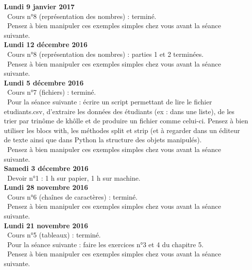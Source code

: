 \documentclass[12pt,a4paper]{article}
\begin{document}
\noindent\textbf{Lundi 9 janvier 2017}\\
\bu\ Cours n°8 (représentation des nombres) : terminé. \\
\bu\ Pensez à bien manipuler ces exemples simples chez vous avant la séance suivante. \vspace{.4cm}\\

\noindent\textbf{Lundi 12 décembre 2016 }\\
\bu\ Cours n°8 (représentation des nombres) : parties 1 et 2 terminées. \\
\bu\ Pensez à bien manipuler ces exemples simples chez vous avant la séance suivante. \vspace{.4cm}\\

\noindent\textbf{Lundi 5 décembre 2016 }\\
\bu\ Cours n°7 (fichiers) : terminé. \\
\bu\ Pour la séance suivante : écrire un script permettant de lire le fichier etudiants.csv, d'extraire les données des étudiants (ex : dans une liste), de les trier par trinôme de khôlle et de produire un fichier comme celui-ci. 
Pensez à bien utiliser les blocs with, les méthodes split et strip (et à regarder dans un éditeur de texte ainsi que dans Python la structure des objets manipulés). \\
\bu\ Pensez à bien manipuler ces exemples simples chez vous avant la séance suivante. \vspace{.4cm}\\

\noindent\textbf{Samedi 3 décembre 2016}\\
\bu\ Devoir n°1 : 1 h sur papier, 1 h sur machine.\vspace{.4cm}\\

\noindent\textbf{Lundi 28 novembre 2016 }\\
\bu\ Cours n°6 (chaînes de caractères) : terminé. \\
\bu\ Pensez à bien manipuler ces exemples simples chez vous avant la séance suivante. \vspace{.4cm}\\

\noindent\textbf{Lundi 21 novembre 2016 }\\
\bu\ Cours n°5 (tableaux) : terminé. \\
\bu\ Pour la séance suivante : faire les exercices n°3 et 4 du chapitre 5. \\
\bu\ Pensez à bien manipuler ces exemples simples chez vous avant la séance suivante. \vspace{.4cm}\\
\end{document}
